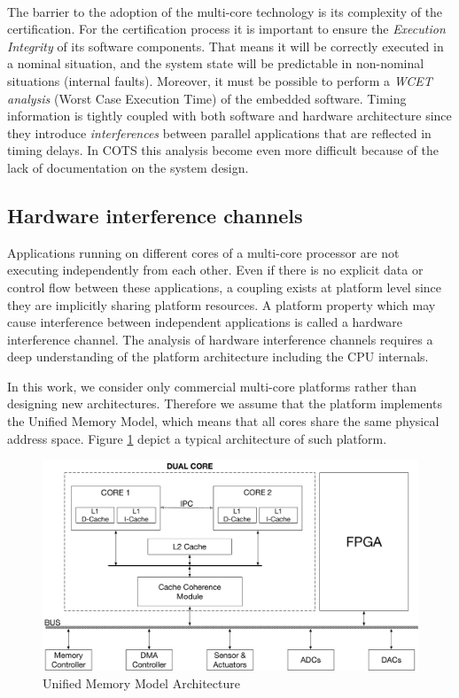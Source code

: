 \paragraph{} The barrier to the adoption of the multi-core technology is its complexity of the certification. For the certification process it is important to ensure the \emph{Execution Integrity} of its software components. That means it will be correctly executed in a nominal situation, and the system state will be predictable in non-nominal situations (internal faults). Moreover, it must be possible to perform a \emph{WCET analysis} (Worst Case Execution Time) of the embedded software. Timing information is tightly coupled with both software and hardware architecture since they introduce \emph{interferences} between parallel applications that are reflected in timing delays. In COTS this analysis become even more difficult because of the lack of documentation on the system design.

\subsection{Hardware interference channels} 
Applications running on different cores of a multi-core processor are not executing independently from each other. Even if there is no explicit data or control flow between these applications, a coupling exists at platform level since they are implicitly sharing platform resources. A platform property which may cause interference between independent applications is called a hardware interference channel. The analysis of hardware interference channels requires a deep understanding of the platform architecture including the CPU internals.
\par In this work, we consider only commercial multi-core platforms rather than designing new architectures. Therefore we assume that the platform implements the Unified Memory Model, which means that all cores share the same physical address space. Figure \ref{fig:unifiedmemorymodel} depict a typical architecture of such platform.

\begin{figure}[htbp] 
\centering    
\includegraphics[width=1.0\textwidth]{UnifiedMemoryModel}
\caption{Unified Memory Model Architecture}
\label{fig:unifiedmemorymodel}
\end{figure}

